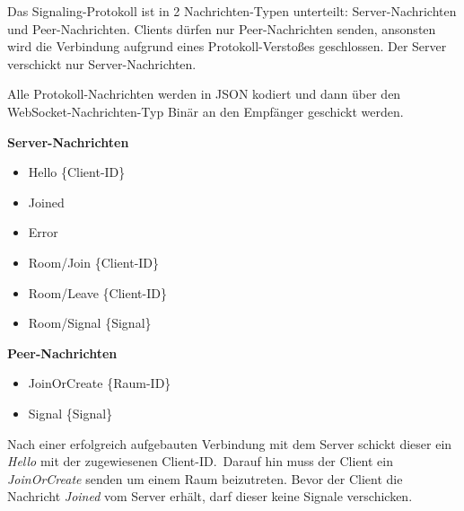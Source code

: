 \documentclass{article}
\begin{document}
\begin{onecolumn}
Das Signaling-Protokoll ist in 2 Nachrichten-Typen unterteilt:
Server-Nachrichten und Peer-Nachrichten. Clients dürfen nur Peer-Nachrichten
senden, ansonsten wird die Verbindung aufgrund eines Protokoll-Verstoßes
geschlossen. Der Server verschickt nur Server-Nachrichten.

Alle Protokoll-Nachrichten werden in JSON kodiert und dann über den
WebSocket-Nachrichten-Typ Binär an den Empfänger geschickt werden.

\vspace{0.5em}

\textbf{Server-Nachrichten}

\begin{itemize}
	\item Hello \{Client-ID\}
	\item Joined
	\item Error
	\item Room/Join \{Client-ID\}
	\item Room/Leave \{Client-ID\}
	\item Room/Signal \{Signal\}
\end{itemize}

\vspace{0.5em}

\textbf{Peer-Nachrichten}

\begin{itemize}
	\item JoinOrCreate \{Raum-ID\}
	\item Signal \{Signal\}
\end{itemize}

\vspace{0.5em}

Nach einer erfolgreich aufgebauten Verbindung mit dem Server schickt dieser ein
\textit{Hello} mit der zugewiesenen Client-ID.\ Darauf hin muss der Client ein
\textit{JoinOrCreate} senden um einem Raum beizutreten. Bevor der Client die
Nachricht \textit{Joined} vom Server erhält, darf dieser keine Signale
verschicken.


\end{onecolumn}
\end{document}
